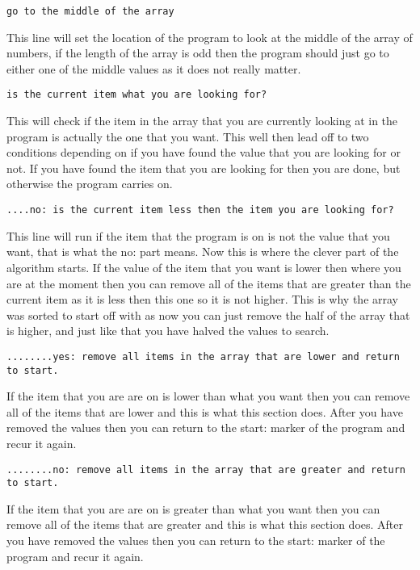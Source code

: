 \documentclass{article}
\begin{document}
\begin{verbatim}
go to the middle of the array 
\end{verbatim}
This line will set the location of the program to look at the middle of the array of numbers, if the length of the array is odd then the program should just go to either one of the middle values as it does not really matter. 

\begin{verbatim}
is the current item what you are looking for?
\end{verbatim}
This will check if the item in the array that you are currently looking at in the program is actually the one that you want. This well then lead off to two conditions depending on if you have found the value that you are looking for or not. If you have found the item that you are looking for then you are done, but otherwise the program carries on. 

\begin{verbatim}
....no: is the current item less then the item you are looking for?
\end{verbatim}
This line will run if the item that the program is on is not the value that you want, that is what the no: part means. Now this is where the clever part of the algorithm starts. If the value of the item that you want is lower then where you are at the moment then you can remove all of the items that are greater than the current item as it is less then this one so it is not higher. This is why the array was sorted to start off with as now you can just remove the half of the array that is higher, and just like that you have halved the values to search. 

\begin{verbatim}
........yes: remove all items in the array that are lower and return to start.
\end{verbatim}
If the item that you are are on is lower than what you want then you can remove all of the items that are lower and this is what this section does. After you have removed the values then you can return to the start: marker of the program and recur it again. 

\begin{verbatim}
........no: remove all items in the array that are greater and return to start.
\end{verbatim}
If the item that you are are on is greater than what you want then you can remove all of the items that are greater and this is what this section does. After you have removed the values then you can return to the start: marker of the program and recur it again. 
\end{document}

